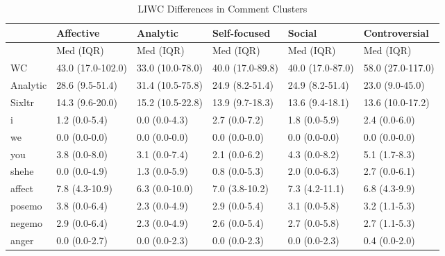 \begin{table*}
\caption{LIWC Differences in Comment Clusters}
\label{tab:commentclusterLIWC}
\small
\begin{tabular}{l|l|l|l|l|l}
 & \textbf{Affective} & \textbf{Analytic} & \textbf{Self-focused} & \textbf{Social} & \textbf{Controversial} \\
 \hline
 & Med (IQR) & Med (IQR) & Med (IQR) & Med (IQR) & Med (IQR)\\
 \hline
WC & 43.0 (17.0-102.0) & 33.0 (10.0-78.0) & 40.0 (17.0-89.8) & 40.0 (17.0-87.0) & 58.0 (27.0-117.0) \\
Analytic & 28.6 (9.5-51.4) & 31.4 (10.5-75.8) & 24.9 (8.2-51.4) & 24.9 (8.2-51.4) & 23.0 (9.0-45.0) \\
Sixltr & 14.3 (9.6-20.0) & 15.2 (10.5-22.8) & 13.9 (9.7-18.3) & 13.6 (9.4-18.1) & 13.6 (10.0-17.2) \\
i & 1.2 (0.0-5.4) & 0.0 (0.0-4.3) & 2.7 (0.0-7.2) & 1.8 (0.0-5.9) & 2.4 (0.0-6.0) \\
we & 0.0 (0.0-0.0) & 0.0 (0.0-0.0) & 0.0 (0.0-0.0) & 0.0 (0.0-0.0) & 0.0 (0.0-0.0) \\
you & 3.8 (0.0-8.0) & 3.1 (0.0-7.4) & 2.1 (0.0-6.2) & 4.3 (0.0-8.2) & 5.1 (1.7-8.3) \\
shehe & 0.0 (0.0-4.9) &1.3 (0.0-5.9) & 0.8 (0.0-5.3) & 2.0 (0.0-6.3) & 2.7 (0.0-6.1) \\
affect & 7.8 (4.3-10.9) & 6.3 (0.0-10.0) & 7.0 (3.8-10.2) & 7.3 (4.2-11.1) & 6.8 (4.3-9.9) \\
posemo & 3.8 (0.0-6.4) & 2.3 (0.0-4.9) & 2.9 (0.0-5.4) & 3.1 (0.0-5.8) & 3.2 (1.1-5.3) \\
negemo & 2.9 (0.0-6.4) & 2.3 (0.0-4.9) & 2.6 (0.0-5.4) & 2.7 (0.0-5.8) & 2.7 (1.1-5.3) \\
anger & 0.0 (0.0-2.7) & 0.0 (0.0-2.3) &0.0 (0.0-2.3) & 0.0 (0.0-2.3) & 0.4 (0.0-2.0) \\


\end{tabular}
\end{table*}
